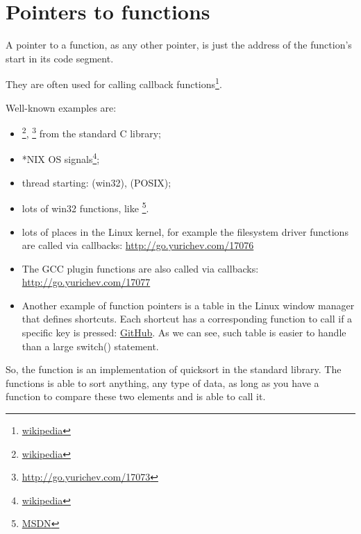 \newcommand{\comp}{\TT{comp()}\xspace}
\section{Pointers to functions}
\label{sec:pointerstofunctions}

\myindex{\CLanguageElements!\Pointers}

A pointer to a function, as any other pointer, is just the address of the function's start in its code segment.

They are often used for calling callback functions\footnote{\href{http://go.yurichev.com/17071}{wikipedia}}.

Well-known examples are:

\begin{itemize}
\item \qsort\footnote{\href{http://go.yurichev.com/17072}{wikipedia}},
{}\footnote{\url{http://go.yurichev.com/17073}} from the standard C library; 

\item *NIX OS signals\footnote{\href{http://go.yurichev.com/17074}{wikipedia}};

\item thread starting:  (win32),  (POSIX);

\item lots of win32 functions, like \footnote{\href{http://go.yurichev.com/17075}{MSDN}}.

\item lots of places in the Linux kernel, for example the filesystem driver functions are called via callbacks: 
\url{http://go.yurichev.com/17076}

\item The GCC plugin functions are also called via callbacks: 
\url{http://go.yurichev.com/17077}

\item Another example of function pointers is a table in the  Linux window manager that defines shortcuts.
Each shortcut has a corresponding function to call if a specific key is pressed: \href{http://go.yurichev.com/17078}{GitHub}.
As we can see, such table is easier to handle than a large switch() statement.
\end{itemize}


So, the \qsort function is an implementation of quicksort in the \CCpp standard library. 
The functions is able to sort anything, any type of data, as long as you have a function to compare these two elements 
and \qsort is able to call it.

